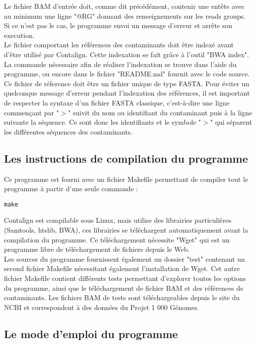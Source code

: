 \documentclass[a4paper,12pt]{article}
\begin{document}
Le fichier BAM d'entrée doit, comme dit précédément, contenir une entête avec au minimum une ligne "@RG" donnant des renseignements sur les reads groups. Si ce n'est pas le cas, le programme envoi un message d'erreur et arrête son execution. \\

Le fichier comportant les références des contaminants doit être indexé avant d'être utilisé par Contalign. Cette indexation se fait grâce à l'outil "BWA index". La commande nécessaire afin de réaliser l'indexation se trouve dans l'aide du programme, ou encore dans le fichier "README.md" fournit avec le code source. Ce fichier de réference doit être un fichier unique de type FASTA. Pour éviter un quelconque message d'erreur pendant l'indexation des références, il est important de respecter la syntaxe d'un fichier FASTA classique, c'est-à-dire une ligne commençant par "$>$" suivit du nom ou identifiant du contaminant puis à la ligne suivante la séquence. Ce sont donc les identifiants et le symbole "$>$" qui séparent les différentes séquences des contaminants.
\\
\subsection{Les instructions de compilation du programme}
Ce programme est fourni avec un fichier Makefile permettant de compiler tout le programme à partir d'une seule commande :

\lstset{language=C, basicstyle=\small\ttfamily, breaklines,prebreak= , postbreak= , frame=shadowbox}
\begin{lstlisting} 
make 
\end{lstlisting} 
Contalign est compilable sous Linux, mais utilise des librairies particulières (Samtools, htslib, BWA), ces librairies se téléchargent automatiquement avant la compilation du programme. Ce téléchargement nécessite "Wget" qui est un programme libre de téléchargement de fichiers depuis le Web. \\ Les sources du programme fournissent également un dossier "test" contenant un second fichier Makefile nécessitant également l'installation de Wget. Cet autre fichier Makefile contient différents tests permettant d'explorer toutes les options du programme, ainsi que le téléchargement de fichier BAM et des références de contaminants. Les fichiers BAM de tests sont téléchargeables depuis le site du NCBI et correspondent à des données du Projet 1 000 Génomes. 
\subsection{Le mode d'emploi du programme}
\end{document}
